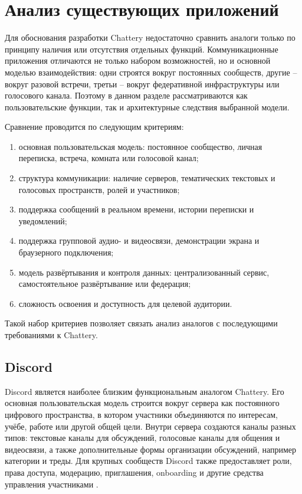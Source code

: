 \documentclass[a4paper,12pt]{extarticle}
\begin{document}
\section{Анализ существующих приложений}

Для обоснования разработки Chattery недостаточно сравнить аналоги только по принципу наличия или отсутствия отдельных функций. Коммуникационные приложения отличаются не только набором возможностей, но и основной моделью взаимодействия: одни строятся вокруг постоянных сообществ, другие -- вокруг разовой встречи, третьи -- вокруг федеративной инфраструктуры или голосового канала. Поэтому в данном разделе рассматриваются как пользовательские функции, так и архитектурные следствия выбранной модели.

Сравнение проводится по следующим критериям:
\begin{enumerate}
    \item основная пользовательская модель: постоянное сообщество, личная переписка, встреча, комната или голосовой канал;
    \item структура коммуникации: наличие серверов, тематических текстовых и голосовых пространств, ролей и участников;
    \item поддержка сообщений в реальном времени, истории переписки и уведомлений;
    \item поддержка групповой аудио- и видеосвязи, демонстрации экрана и браузерного подключения;
    \item модель развёртывания и контроля данных: централизованный сервис, самостоятельное развёртывание или федерация;
    \item сложность освоения и доступность для целевой аудитории.
\end{enumerate}

Такой набор критериев позволяет связать анализ аналогов с последующими требованиями к Chattery.

\subsection{Discord}

Discord является наиболее близким функциональным аналогом Chattery. Его основная пользовательская модель строится вокруг сервера как постоянного цифрового пространства, в котором участники объединяются по интересам, учёбе, работе или другой общей цели. Внутри сервера создаются каналы разных типов: текстовые каналы для обсуждений, голосовые каналы для общения и видеосвязи, а также дополнительные формы организации обсуждений, например категории и треды. Для крупных сообществ Discord также предоставляет роли, права доступа, модерацию, приглашения, onboarding и другие средства управления участниками \cite{discord}.
\end{document}
